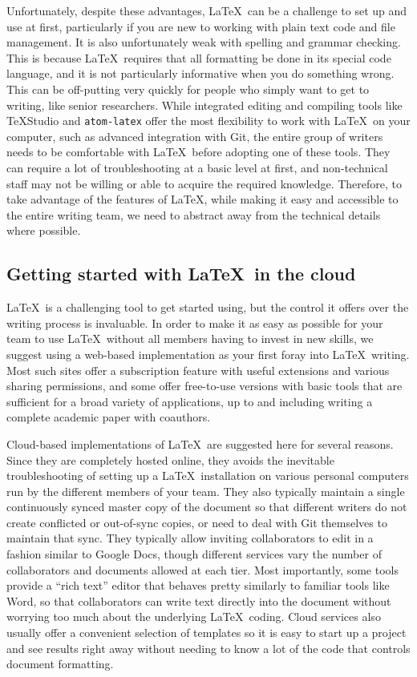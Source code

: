 Unfortunately, despite these advantages, \LaTeX\ can be a challenge to set up and use at first,
particularly if you are new to working with plain text code and file management.
It is also unfortunately weak with spelling and grammar checking.
This is because \LaTeX\ requires that all formatting be done in its special code language,
and it is not particularly informative when you do something wrong.
This can be off-putting very quickly for people
who simply want to get to writing, like senior researchers.
While integrated editing and compiling tools like TeXStudio
and \texttt{atom-latex}
offer the most flexibility to work with \LaTeX\ on your computer,
such as advanced integration with Git,
the entire group of writers needs to be comfortable
with \LaTeX\ before adopting one of these tools.
They can require a lot of troubleshooting at a basic level at first,
and non-technical staff may not be willing or able to acquire the required knowledge.
Therefore, to take advantage of the features of \LaTeX,
while making it easy and accessible to the entire writing team,
we need to abstract away from the technical details where possible.

\subsection{Getting started with \LaTeX\ in the cloud}

\LaTeX\ is a challenging tool to get started using,
but the control it offers over the writing process is invaluable.
In order to make it as easy as possible for your team
to use \LaTeX\ without all members having to invest in new skills,
we suggest using a web-based implementation as your first foray into \LaTeX\ writing.
Most such sites offer a subscription feature with useful extensions and various sharing permissions,
and some offer free-to-use versions with basic tools that are sufficient
for a broad variety of applications,
up to and including writing a complete academic paper with coauthors.

Cloud-based implementations of \LaTeX\ are suggested here for several reasons.
Since they are completely hosted online,
they avoids the inevitable troubleshooting of setting up a \LaTeX\ installation
on various personal computers run by the different members of your team.
They also typically maintain a single continuously synced master copy of the document
so that different writers do not create conflicted or out-of-sync copies,
or need to deal with Git themselves to maintain that sync.
They typically allow inviting collaborators to edit in a fashion similar to Google Docs,
though different services vary the number of collaborators and documents allowed at each tier.
Most importantly, some tools provide a ``rich text'' editor
that behaves pretty similarly to familiar tools like Word,
so that collaborators can write text directly into the document without worrying too much
about the underlying \LaTeX\ coding.
Cloud services also usually offer a convenient selection of templates
so it is easy to start up a project and see results right away
without needing to know a lot of the code that controls document formatting.

